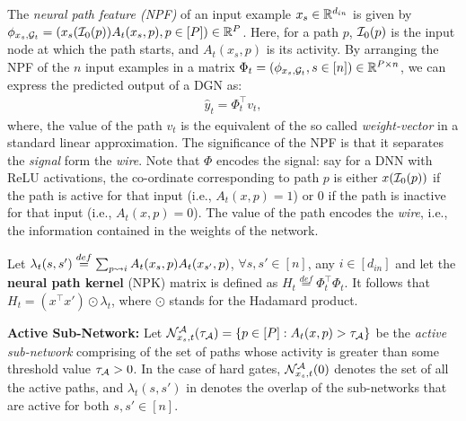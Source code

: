 The \emph{neural path feature (NPF)} of an input example $x_s\in \mathbb{R}^{d_{in}}$ is given by $\phi_{x_s,\mathcal{G}_t}=(x_s(\mathcal{I}_0(p))A_t(x_s,p) ,p\in[P])\in\mathbb{R}^P$. Here, for a path $p$, $\mathcal{I}_0(p)$ is the input node at which the path starts, and $A_t(x_s,p)$ is its activity. By arranging the NPF of the $n$ input examples in a matrix $\Phi_t=(\phi_{x_s,\mathcal{G}_t},s\in[n])\in\mathbb{R}^{P\times n}$, we can express the predicted output of a DGN as: 
\begin{align}\label{eq:npfbasic}
\hat{y}_t=\Phi_t^\top v_t,
\end{align}
where, the value of the path $v_t$ is the equivalent of the so called \emph{weight-vector} in a standard linear approximation. 
The significance of the NPF is that it separates the \emph{signal} form the \emph{wire}. Note that $\Phi$ encodes the signal: say for a DNN with ReLU activations, the co-ordinate corresponding to path $p$ is either $x(\mathcal{I}_0(p))$ if the path is active for that input (i.e., $A_t(x,p)=1$) or $0$ if the path is inactive for that input  (i.e., $A_t(x,p)=0$). The value of the path encodes the \emph{wire}, i.e., the information contained in the weights of the network.
\begin{lemma}\label{lm:npk}
Let $\lambda_t(s,s')\stackrel{def}{=}\sum_{p\rightsquigarrow i} A_t(x_s,p) A_t(x_{s'},p)$, $\forall s,s'\in[n]$, any $i\in [d_{in}]$ and let the \textbf{neural path kernel} (NPK) matrix is defined as $H_t\stackrel{def}=\Phi^\top_t\Phi_t$. It follows that $H_t= (x^\top x')\odot\lambda_t$, where $\odot$ stands for the Hadamard product.
\end{lemma}
\textbf{Active Sub-Network:} Let $\mathcal{N}^{\mathcal{A}}_{x_s,t}(\tau_{\mathcal{A}})=\{p\in[P]:A_t(x,p)>\tau_{\mathcal{A}}\}$ be the \emph{active sub-network} comprising of the set of paths whose activity is greater than some threshold value $\tau_{\mathcal{A}}>0$. In the case of hard gates, $\mathcal{N}^{\mathcal{A}}_{x_s,t}(0)$ denotes the set of all the active paths, and $\lambda_t(s,s')$ in  denotes the overlap of the sub-networks that are active for both $s,s'\in[n]$.\\
